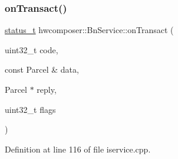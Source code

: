 \subsubsection{\texorpdfstring{on\+Transact()}{onTransact()}}
{\footnotesize\ttfamily \mbox{\hyperlink{hwcserviceapi_8h_a3806fb2027d9a316d8ca8d9b8b8eb96f}{status\+\_\+t}} hwcomposer\+::\+Bn\+Service\+::on\+Transact (\begin{DoxyParamCaption}\item[{uint32\+\_\+t}]{code,  }\item[{const Parcel \&}]{data,  }\item[{Parcel $\ast$}]{reply,  }\item[{uint32\+\_\+t}]{flags }\end{DoxyParamCaption})\hspace{0.3cm}{\ttfamily [override]}}



Definition at line 116 of file iservice.\+cpp.


